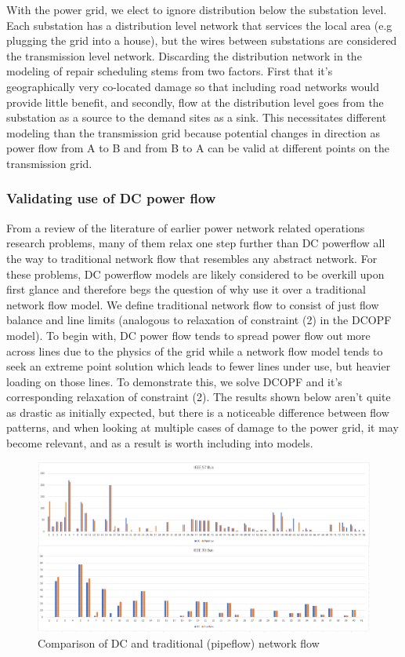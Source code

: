 \documentclass{article}
\begin{document}
	With the power grid, we elect to ignore distribution below the substation level. Each substation has a distribution level network that services the local area (e.g plugging the grid into a house), but the wires between substations are considered the transmission level network. Discarding the distribution network in the modeling of repair scheduling stems from two factors. First that it's geographically very co-located damage so that including road networks would provide little benefit, and secondly, flow at the distribution level goes from the substation as a source to the demand sites as a sink. This necessitates different modeling than the transmission grid because potential changes in direction as power flow from A to B and from B to A can be valid at different points on the transmission grid.
	\subsubsection{Validating use of DC power flow}
	
	From a review of the literature of earlier power network related operations research problems, many of them relax one step further than DC powerflow all the way to traditional network flow that resembles any abstract network. For these problems, DC powerflow models are likely considered to be overkill upon first glance and therefore begs the question of why use it over a traditional network flow model. We define traditional network flow to consist of just flow balance and line limits (analogous to relaxation of constraint (2) in the DCOPF model). To begin with, DC power flow tends to spread power flow out more across lines due to the physics of the grid while a network flow model tends to seek an extreme point solution which leads to fewer lines under use, but heavier loading on those lines. To demonstrate this, we solve DCOPF and it's corresponding relaxation of constraint (2). The results shown below aren't quite as drastic as initially expected, but there is a noticeable difference between flow patterns, and when looking at multiple cases of damage to the power grid, it may become relevant, and as a result is worth including into models.
	
	\begin{figure}
		\centering
		\includegraphics[width=\linewidth]{DCvsPipeflow.PNG}
		\caption{Comparison of DC and traditional (pipeflow) network flow}
	\end{figure}
	
\end{document}
